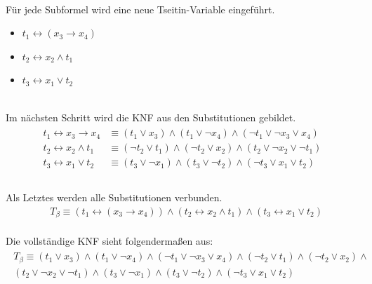 \documentclass[a4,abstract=on]{scrartcl}
\begin{document}
\ \\
Für jede Subformel wird eine neue Tseitin-Variable eingeführt.\\
\begin{itemize}
\item $t_1 \leftrightarrow (x_3 \rightarrow x_4)$
\item $t_2 \leftrightarrow x_2 \wedge t_1$
\item $t_3 \leftrightarrow x_1 \vee t_2$
\end{itemize}
\ \\
Im nächsten Schritt wird die KNF aus den Substitutionen gebildet.\\
\begin{align*}
\begin{aligned}
t_1 \leftrightarrow x_3 \rightarrow x_4 &\equiv (t_1 \vee  x_3) \wedge (t_1 \vee \neg x_4) \wedge (\neg t_1 \vee \neg x_3 \vee x_4)\\
t_2 \leftrightarrow x_2 \wedge t_1 &\equiv (\neg t_2 \vee  t_1) \wedge (\neg t_2 \vee x_2) \wedge (t_2 \vee \neg x_2 \vee \neg t_1)\\
t_3 \leftrightarrow x_1 \vee t_2 &\equiv (t_3 \vee  \neg x_1) \wedge (t_3 \vee \neg t_2) \wedge (\neg t_3 \vee x_1 \vee t_2)\\
\end{aligned}
\end{align*}
\ \\
Als Letztes werden alle Substitutionen verbunden.\\
\begin{align*}
& T_\beta \equiv(t_1 \leftrightarrow (x_3 \rightarrow x_4)) \wedge (t_2 \leftrightarrow x_2 \wedge t_1) \wedge (t_3 \leftrightarrow x_1 \vee t_2)
\end{align*}
\ \\
Die vollständige KNF sieht folgendermaßen aus:\\
\begin{align*}
\begin{aligned}
T_\beta \equiv (t_1 \vee  x_3) \wedge (t_1 \vee \neg x_4) \wedge (\neg t_1 \vee \neg x_3 \vee x_4) \wedge (\neg t_2 \vee  t_1) \wedge (\neg t_2 \vee x_2) \wedge \\
(t_2 \vee \neg x_2 \vee \neg t_1) \wedge (t_3 \vee  \neg x_1) \wedge (t_3 \vee \neg t_2) \wedge (\neg t_3 \vee x_1 \vee t_2)
\end{aligned}
\end{align*}
\end{document}
